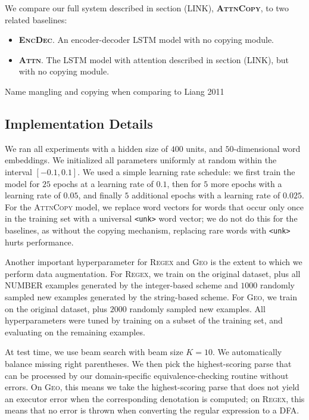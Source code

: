 \documentclass[11pt,letterpaper]{article}
\newcommand{\encdec}{\textsc{EncDec}\xspace}
\newcommand{\attn}{\textsc{Attn}\xspace}
\newcommand{\attncopy}{\textsc{AttnCopy}\xspace}
\newcommand{\regex}{\textsc{Regex}\xspace}
\newcommand{\geo}{\textsc{Geo}\xspace}
\begin{document}
We compare our full system described in section (LINK), \textbf{\attncopy}, 
to two related baselines:
\begin{itemize}
  \item \textbf{\encdec}.  An encoder-decoder LSTM model with no copying module.
  \item \textbf{\attn}.  The LSTM model with attention described in section (LINK),
     but with no copying module.
\end{itemize}

Name mangling and copying when comparing to Liang 2011

\subsection{Implementation Details}
We ran all experiments with a hidden size of $400$ units,
and $50$-dimensional word embeddings.
We initialized all parameters uniformly at random 
within the interval $[-0.1, 0.1]$.
We used a simple learning rate schedule:
we first train the model for $25$ epochs at a learning rate of $0.1$,
then for $5$ more epochs with a learning rate of $0.05$,
and finally $5$ additional epochs with a learning rate of $0.025$.
For the \attncopy model, we replace word vectors for words
that occur only once in the training set 
with a universal \texttt{<unk>} word vector;
we do not do this for the baselines, as without the copying mechanism,
replacing rare words with \texttt{<unk>} hurts performance.

Another important hyperparameter for \regex and \geo is the
extent to which we perform data augmentation.
For \regex, we train on the original dataset,
plus all NUMBER examples generated by the integer-based scheme
and $1000$ randomly sampled new examples generated by the string-based scheme.
For \geo, we train on the original dataset,
plus $2000$ randomly sampled new examples.
All hyperparameters were tuned by training on a subset of the
training set, and evaluating on the remaining examples.

At test time, we use beam search with beam size $K=10$.
We automatically balance missing right parentheses.
We then pick the highest-scoring parse 
that can be processed by our domain-specific
equivalence-checking routine without errors.
On \geo, this means we take the highest-scoring parse
that does not yield an executor error when the
corresponding denotation is computed;
on \regex, this means that no error is thrown when 
converting the regular expression to a DFA.
\end{document}
